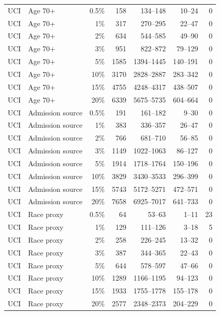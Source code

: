 \begin{longtable}{llrrrrr}
UCI & Age 70+ & 0.5\% & 158 & 134--148 & 10--24 & 0 \\
UCI & Age 70+ & 1\% & 317 & 270--295 & 22--47 & 0 \\
UCI & Age 70+ & 2\% & 634 & 544--585 & 49--90 & 0 \\
UCI & Age 70+ & 3\% & 951 & 822--872 & 79--129 & 0 \\
UCI & Age 70+ & 5\% & 1585 & 1394--1445 & 140--191 & 0 \\
UCI & Age 70+ & 10\% & 3170 & 2828--2887 & 283--342 & 0 \\
UCI & Age 70+ & 15\% & 4755 & 4248--4317 & 438--507 & 0 \\
UCI & Age 70+ & 20\% & 6339 & 5675--5735 & 604--664 & 0 \\
UCI & Admission source & 0.5\% & 191 & 161--182 & 9--30 & 0 \\
UCI & Admission source & 1\% & 383 & 336--357 & 26--47 & 0 \\
UCI & Admission source & 2\% & 766 & 681--710 & 56--85 & 0 \\
UCI & Admission source & 3\% & 1149 & 1022--1063 & 86--127 & 0 \\
UCI & Admission source & 5\% & 1914 & 1718--1764 & 150--196 & 0 \\
UCI & Admission source & 10\% & 3829 & 3430--3533 & 296--399 & 0 \\
UCI & Admission source & 15\% & 5743 & 5172--5271 & 472--571 & 0 \\
UCI & Admission source & 20\% & 7658 & 6925--7017 & 641--733 & 0 \\
UCI & Race proxy & 0.5\% & 64 & 53--63 & 1--11 & 23 \\
UCI & Race proxy & 1\% & 129 & 111--126 & 3--18 & 5 \\
UCI & Race proxy & 2\% & 258 & 226--245 & 13--32 & 0 \\
UCI & Race proxy & 3\% & 387 & 344--365 & 22--43 & 0 \\
UCI & Race proxy & 5\% & 644 & 578--597 & 47--66 & 0 \\
UCI & Race proxy & 10\% & 1289 & 1166--1195 & 94--123 & 0 \\
UCI & Race proxy & 15\% & 1933 & 1755--1778 & 155--178 & 0 \\
UCI & Race proxy & 20\% & 2577 & 2348--2373 & 204--229 & 0 \\
\bottomrule\end{longtable}
